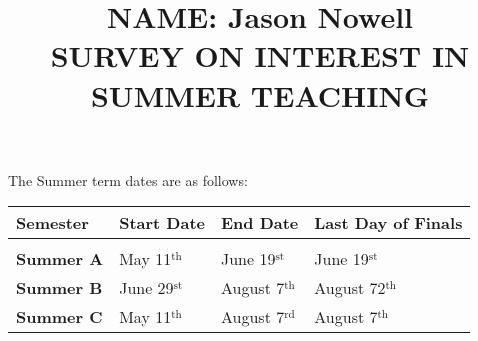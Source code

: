 \documentclass{article}
\title{{\bfseries NAME: Jason Nowell} \hspace*{\fill} \\ SURVEY ON INTEREST IN SUMMER \arabic{currentYear} TEACHING}
\newcounter{currentYear}
\newcommand{\Config}[9]{%
    
    
    
    \newcommand{\SumAS}{%
    #1
    }
    \newcommand{\SumAE}{%
    #2
    }
    \newcommand{\SumAFin}{%
    #3
    }
    \newcommand{\SumBS}{%
    #4
    }
    \newcommand{\SumBE}{%
    #5
    }
    \newcommand{\SumBFin}{%
    #6
    }
    \newcommand{\SumCS}{%
    #7
    }
    \newcommand{\SumCE}{%
    #8
    }
    \newcommand{\SumCFin}{%
    #9
    }
}
\newcommand{\due}[2]{
    \newcommand{\dueDate}{\textbf{#1}\relax}
    \newcommand{\dueRecipient}{\textbf{#2}\relax}
}
\begin{document}

\Config
	{%
	May 11$^{\text{th}}$
	}
	{%
	June 19$^{\text{st}}$
	}
	{%
	June 19$^{\text{st}}$
	}
	{%
	June 29$^{\text{st}}$
	}
	{%
	August 7$^{\text{th}}$
	}
	{%
	August 72$^{\text{th}}$
	}
	{%
	May 11$^{\text{th}}$
	}
	{%
	August 7$^{\text{rd}}$
	}
	{%
	August 7$^{\text{th}}$
	}

\due{%
Noon, January 31$^{\text{st}}$
}{%
Sandra Gagnon
}


\date{}
\maketitle
\vspace{-2cm}

The Summer   term dates are as follows:
\vspace{5pt}

\begin{tabular}{llll}
\textbf{\Large{Semester}} & \large{Start Date} & \large{End Date} & \large{Last Day of Finals}\\\hline &&&\\
\textbf{Summer A} & \SumAS & \SumAE & \SumAFin \\[5pt]
\textbf{Summer B} & \SumBS & \SumBE & \SumBFin \\[5pt]
\textbf{Summer C} & \SumCS & \SumCE & \SumCFin \\

\end{tabular}
\end{document}
